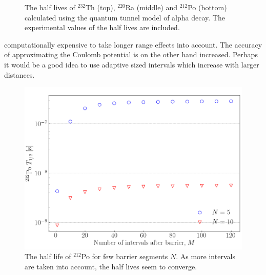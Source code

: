\documentclass[twocolumn]{article}
\begin{document}
\begin{large}
\begin{figure}
    \caption{The half lives of $^{232}$Th (top), $^{220}$Ra (middle) and $^{212}$Po (bottom) calculated using the quantum tunnel model of alpha decay. The experimental values of the half lives are included.}
    \label{28mar2242}
\end{figure}
\newpage computationally expensive to take longer range effects into account. The accuracy of approximating the Coulomb potential is on the other hand increased. Perhaps it would be a good idea to use adaptive sized intervals which increase with larger distances. 

\begin{figure}[t]
    \centering
    \includegraphics[scale=0.4]{212Po_convergence.png}
    \caption{The half life of $^{212}$Po for few barrier segments $N$. As more intervals are taken into account, the half lives seem to converge.}
\end{figure}


\end{large}
\end{document}
